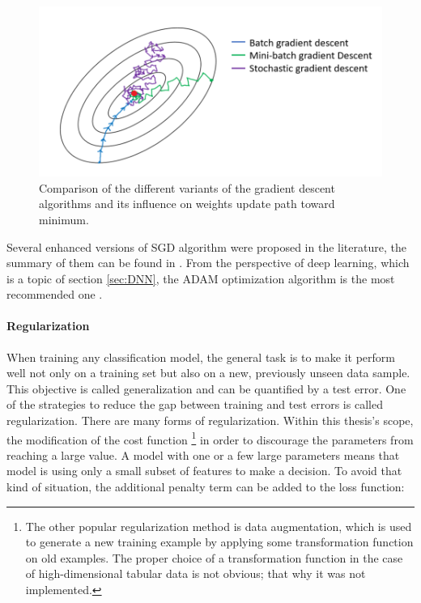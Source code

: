 \begin{figure}[!h]
\centering
\includegraphics{figures/batch_descent.png}
\caption{Comparison of the different variants of the gradient descent algorithms and its influence on weights update path toward minimum.
\label{fig:Batch gradient decent}}
\end{figure}


Several enhanced versions of SGD algorithm were proposed in the literature, the summary of them can be found in \cite{GradientDescent}. 
From the perspective of deep learning, which is a topic of section \ref{sec:DNN}, the ADAM optimization algorithm is the most recommended one \cite{ADAM}. 

\paragraph{Regularization} \mbox{}
\label{sec:regularization}
When training any classification model, the general task is to make it perform well not only on a training set but also on a new, previously unseen data sample. This objective is called generalization and can be quantified by a test error. One of the strategies to reduce the gap between training and test errors is called regularization. There are many forms of regularization. Within this thesis's scope, the modification of the cost function \footnote{The other popular regularization method is data augmentation, which is used to generate a new training example by applying some transformation function on old examples. The proper choice of a transformation function in the case of high-dimensional tabular data is not obvious; that why it was not implemented.} in order to discourage the parameters from reaching a large value. A model with one or a few large parameters means that model is using only a small subset of features to make a decision. To avoid that kind of situation, the additional penalty term can be added to the loss function: 

